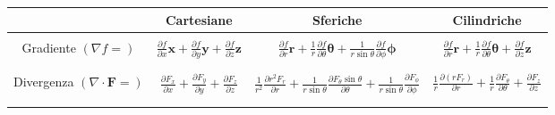 \documentclass{book}
\newcommand{\h}{\mathbf}
\begin{document}
\centering
\begin{tabular}{|c|c|c|c|}
    \hline
                & Cartesiane & Sferiche & Cilindriche   \\ 
    \hline 
    & & & \\[0pt]
    Gradiente $(\nabla f=)$ 
    &  $\frac{\partial f}{\partial x}\h{x}+\frac{\partial f}{\partial y}\h{y}+\frac{\partial f}{\partial z}\h{z}$ 
    & $\frac{\partial f}{\partial r}\h{r}+\frac{1}{r}\frac{\partial f}{\partial \theta}\h{\theta}+\frac{1}{r\sin\theta}\frac{\partial f}{\partial \phi}\h{\phi}$ 
    & $\frac{\partial f}{\partial r}\h{r}+\frac{1}{r}\frac{\partial f}{\partial \theta}\h{\theta}+\frac{\partial f}{\partial z}\h{z}$ \\
    & & & \\
    \hline 
    & & & \\
    Divergenza $(\nabla\cdot\h{F}=)$ 
    & $\frac{\partial F_x}{\partial x}+\frac{\partial F_y}{\partial y}+\frac{\partial F_z}{\partial z}$ 
    & $\frac{1}{r^2}\frac{\partial r^2 F_r}{\partial r}+\frac{1}{r\sin\theta}\frac{\partial F_\theta\sin\theta}{\partial \theta}+\frac{1}{r\sin\theta}\frac{\partial F_\phi}{\partial \phi}$ 
    & $\frac{1}{r}\frac{\partial (r F_r)}{\partial r}+\frac{1}{r}\frac{\partial F_\theta}{\partial \theta}+\frac{\partial F_z}{\partial z}$ \\
    & & & \\
    \hline
    & & & \\
    

\end{tabular}
\end{document}

